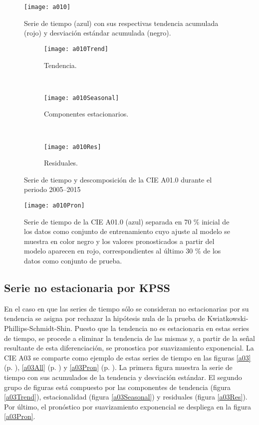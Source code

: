 \documentclass[final,5p,times,twocolumn]{elsarticle}
\begin{document}
\begin{figure*}
  \texttt{[image: a010]}
\caption{Serie de tiempo (azul) con sus respectivas tendencia acumulada (rojo) y desviación estándar acumulada (negro).}
\label{a010} 
\end{figure*}
\begin{figure*}
\centering
\begin{subfigure}{\textwidth}
  \texttt{[image: a010Trend]}
\caption{Tendencia.}
\label{a010Trend}  
\end{subfigure}  
\\
\begin{subfigure}{\textwidth}
  \texttt{[image: a010Seasonal]}
\caption{Componentes estacionarios.}
\label{a010Seasonal}  
\end{subfigure}  
\\
\begin{subfigure}{\textwidth}
  \texttt{[image: a010Res]}
\caption{Residuales.}
\label{a010Res}  
\end{subfigure}
\caption{Serie de tiempo y descomposición de la CIE A01.0 durante el periodo 2005--2015}
\label{a010All}
\end{figure*}

\begin{figure*}
  \texttt{[image: a010Pron]}
  \caption{Serie de tiempo de la CIE A01.0 (azul) separada en 70 \% inicial de los datos como conjunto de entrenamiento cuyo ajuste al modelo se muestra en color negro y los valores pronosticados a partir del modelo aparecen en rojo, correspondientes al último 30 \% de los datos como conjunto de prueba.}
  \label{a010Pron}
\end{figure*}

\subsection{Serie no estacionaria por KPSS}
En el caso en que las series de tiempo sólo se consideran no estacionarias por su tendencia se asigna por rechazar la hipótesis nula de la prueba de Kwiatkowski-Phillips-Schmidt-Shin. Puesto que la tendencia no es estacionaria en estas series de tiempo, se procede a eliminar la tendencia de las mismas y, a partir de la señal resultante de esta diferenciación, se pronostica por suavizamiento exponencial. La CIE A03 se comparte como ejemplo de estas series de tiempo en las figuras \ref{a03} (p. \pageref{a03}), \ref{a03All} (p. \pageref{a03All}) y \ref{a03Pron} (p. \pageref{a03Pron}). La primera figura muestra la serie de tiempo con sus acumulados de la tendencia y desviación estándar. El segundo grupo de figuras está compuesto  por las componentes de tendencia (figura \ref{a03Trend}), estacionalidad (figura \ref{a03Seasonal}) y residuales (figura \ref{a03Res}). Por último, el pronóstico por suavizamiento exponencial se despliega en la figura \ref{a03Pron}.
\end{document}
